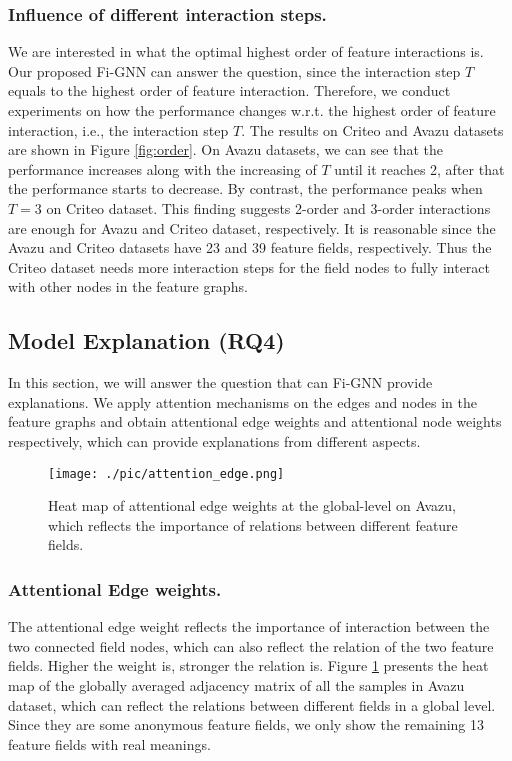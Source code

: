 \documentclass[sigconf]{acmart}
\begin{document}
\subsubsection{\textbf{Influence of different interaction steps.}}
We are interested in what the optimal highest order of feature interactions is.  
Our proposed Fi-GNN can answer the question, since the interaction step $T$ equals to the highest order of feature interaction.
Therefore, we conduct experiments on how the performance changes w.r.t. the highest order of feature interaction, i.e., the interaction step $T$.
The results on Criteo and Avazu datasets are shown in Figure \ref{fig:order}.
On Avazu datasets, we can see that the performance increases along with the increasing of $T$ until it reaches 2, after that the performance starts to decrease.
By contrast, the performance peaks when $T=3$ on Criteo dataset.
This finding suggests 2-order and 3-order interactions are enough for Avazu and Criteo dataset, respectively.
It is reasonable since the Avazu and Criteo datasets have 23 and 39 feature fields, respectively.
Thus the Criteo dataset needs more interaction steps for the field nodes to fully interact with other nodes in the feature graphs.



\subsection{Model Explanation (RQ4)} \label{sect:explannation}
In this section, we will answer the question that can Fi-GNN provide explanations.
We apply attention mechanisms on the edges and nodes in the feature graphs and obtain attentional edge weights and attentional node weights respectively, which can provide explanations from different aspects.

\begin{figure}[t]
\centering
\texttt{[image: ./pic/attention\_edge.png]}
\caption{Heat map of attentional edge weights at the global-level on Avazu, which reflects the importance of relations between different feature fields.}
\label{fig:heatmap_edge}
\end{figure}

\subsubsection{\textbf{Attentional Edge weights.}}
The attentional edge weight reflects the importance of interaction between the two connected field nodes, which can also reflect the relation of the two feature fields.
Higher the weight is, stronger the relation is.
Figure \ref{fig:heatmap_edge} presents the heat map of the globally averaged adjacency matrix of all the samples in Avazu dataset, which can reflect the relations between different fields in a global level. 
Since they are some anonymous feature fields, we only show the remaining 13 feature fields with real meanings.
\end{document}
